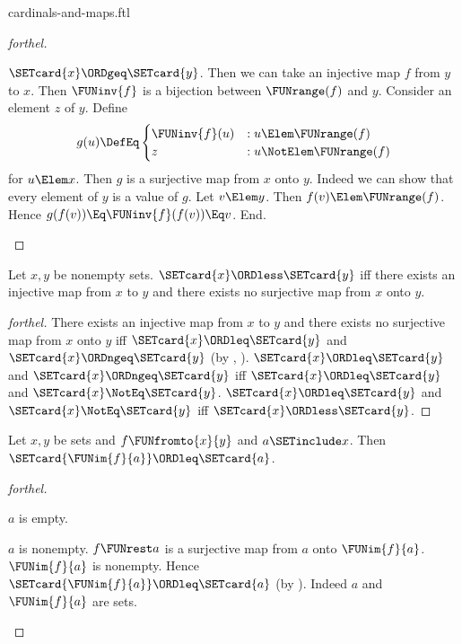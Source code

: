 \documentclass{stex}
\begin{document}
\begin{smodule}{cardinals-and-maps.ftl}
\begin{proof}[forthel]
  \begin{case}{$\SETcard{x} \ORDgeq \SETcard{y}$.}
    Then we can take an injective map $f$ from $y$ to $x$.
    Then $\FUNinv{f}$ is a bijection between $\FUNrange(f)$ and $y$.
    Consider an element $z$ of $y$.
    Define \[ g(u) \DefEq
      \begin{cases}
        \FUNinv{f}(u) & : u \Elem \FUNrange(f) \\
        z         & : u \NotElem \FUNrange(f)
      \end{cases} \]
    for $u \Elem x$.
    Then $g$ is a surjective map from $x$ onto $y$.
    Indeed we can show that every element of $y$ is a value of $g$.
      Let $v \Elem y$.
      Then $f(v) \Elem \FUNrange(f)$.
      Hence $g(f(v)) \Eq \FUNinv{f}(f(v)) \Eq v$.
    End.
  \end{case}
\end{proof}

\begin{proposition}[forthel]
  Let $x, y$ be nonempty sets.
  $\SETcard{x} \ORDless \SETcard{y}$ iff there exists an injective map from $x$ to $y$ and there exists no surjective map from $x$ onto $y$.
\end{proposition}
\begin{proof}[forthel]
  There exists an injective map from $x$ to $y$ and there exists no surjective map from $x$ onto $y$ iff $\SETcard{x} \ORDleq \SETcard{y}$ and $\SETcard{x} \ORDngeq \SETcard{y}$ (by , ).
  $\SETcard{x} \ORDleq \SETcard{y}$ and $\SETcard{x} \ORDngeq \SETcard{y}$ iff $\SETcard{x} \ORDleq \SETcard{y}$ and $\SETcard{x} \NotEq \SETcard{y}$.
  $\SETcard{x} \ORDleq \SETcard{y}$ and $\SETcard{x} \NotEq \SETcard{y}$ iff $\SETcard{x} \ORDless \SETcard{y}$.
\end{proof}


\begin{proposition}[forthel,name=cardinality of image]
  Let $x, y$ be sets and $f \FUNfromto{x}{y}$ and $a \SETinclude x$.
  Then $\SETcard{\FUNim{f}{a}} \ORDleq \SETcard{a}$.
\end{proposition}
\begin{proof}[forthel]
  \begin{case}{$a$ is empty.} \end{case}

  \begin{case}{$a$ is nonempty.}
    $f \FUNrest a$ is a surjective map from $a$ onto $\FUNim{f}{a}$.
    $\FUNim{f}{a}$ is nonempty.
    Hence $\SETcard{\FUNim{f}{a}} \ORDleq \SETcard{a}$ (by ).
    Indeed $a$ and $\FUNim{f}{a}$ are sets.
  \end{case}
\end{proof}
\end{smodule}
\end{document}
